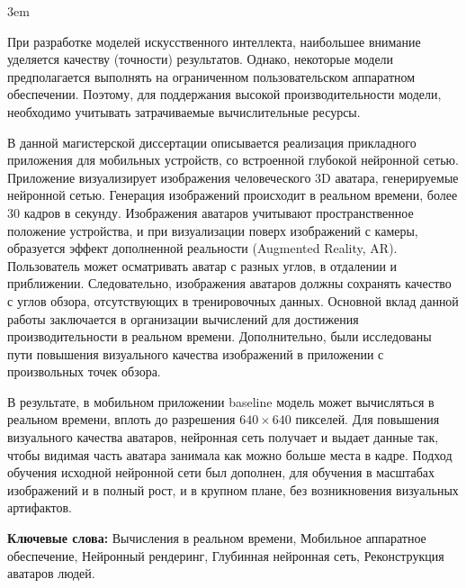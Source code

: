 \emergencystretch 3em
\par
При разработке моделей искусственного интеллекта, наибольшее внимание уделяется качеству (точности) результатов. Однако, некоторые модели предполагается выполнять на ограниченном пользовательском аппаратном обеспечении. Поэтому, для поддержания высокой производительности модели, необходимо учитывать затрачиваемые вычислительные ресурсы.

\par
В данной магистерской диссертации описывается реализация прикладного приложения для мобильных устройств, со встроенной глубокой нейронной сетью. Приложение визуализирует изображения человеческого 3D аватара, генерируемые нейронной сетью. Генерация изображений происходит в реальном времени, более 30 кадров в секунду. Изображения аватаров учитывают пространственное положение устройства, и при визуализации поверх изображений с камеры, образуется эффект дополненной реальности (Augmented Reality, AR). Пользователь может осматривать аватар с разных углов, в отдалении и приближении. Следовательно, изображения аватаров должны сохранять качество с углов обзора, отсутствующих в тренировочных данных. Основной вклад данной работы заключается в организации вычислений для достижения производительности в реальном времени. Дополнительно, были исследованы пути повышения визуального качества изображений в приложении с произвольных точек обзора.	

\par
В результате, в мобильном приложении baseline модель \alert{\cite{stylepeople}} может вычисляться в реальном времени, вплоть до разрешения $640\times640$ пикселей. Для повышения визуального качества аватаров, нейронная сеть получает и выдает данные так, чтобы видимая часть аватара занимала как можно больше места в кадре. Подход обучения исходной нейронной сети был дополнен, для обучения в масштабах изображений и в полный рост, и в крупном плане, без возникновения визуальных артифактов. 

\par
\textbf{Ключевые слова:} Вычисления в реальном времени, Мобильное аппаратное обеспечение, Нейронный рендеринг, Глубинная нейронная сеть, Реконструкция аватаров людей.  
